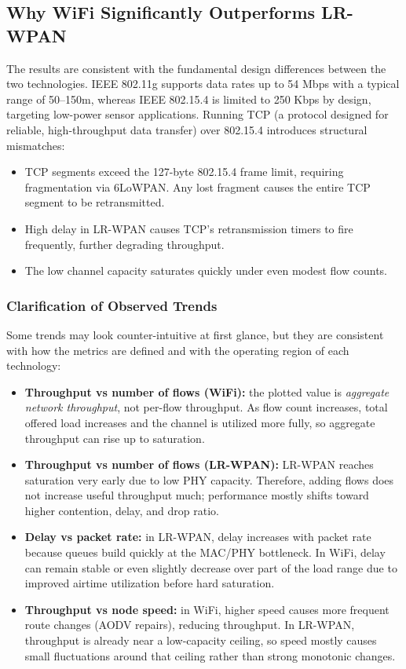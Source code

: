 \documentclass[12pt,a4paper]{article}
\begin{document}
\subsection{Why WiFi Significantly Outperforms LR-WPAN}

The results are consistent with the fundamental design differences between the two technologies. IEEE 802.11g supports data rates up to 54 Mbps with a typical range of 50--150m, whereas IEEE 802.15.4 is limited to 250 Kbps by design, targeting low-power sensor applications. Running TCP (a protocol designed for reliable, high-throughput data transfer) over 802.15.4 introduces structural mismatches:

\begin{itemize}
    \item TCP segments exceed the 127-byte 802.15.4 frame limit, requiring fragmentation via 6LoWPAN. Any lost fragment causes the entire TCP segment to be retransmitted.
    \item High delay in LR-WPAN causes TCP's retransmission timers to fire frequently, further degrading throughput.
    \item The low channel capacity saturates quickly under even modest flow counts.
\end{itemize}

\subsubsection{Clarification of Observed Trends}

Some trends may look counter-intuitive at first glance, but they are consistent with how the metrics are defined and with the operating region of each technology:

\begin{itemize}
    \item \textbf{Throughput vs number of flows (WiFi):} the plotted value is \emph{aggregate network throughput}, not per-flow throughput. As flow count increases, total offered load increases and the channel is utilized more fully, so aggregate throughput can rise up to saturation.
    \item \textbf{Throughput vs number of flows (LR-WPAN):} LR-WPAN reaches saturation very early due to low PHY capacity. Therefore, adding flows does not increase useful throughput much; performance mostly shifts toward higher contention, delay, and drop ratio.
    \item \textbf{Delay vs packet rate:} in LR-WPAN, delay increases with packet rate because queues build quickly at the MAC/PHY bottleneck. In WiFi, delay can remain stable or even slightly decrease over part of the load range due to improved airtime utilization before hard saturation.
    \item \textbf{Throughput vs node speed:} in WiFi, higher speed causes more frequent route changes (AODV repairs), reducing throughput. In LR-WPAN, throughput is already near a low-capacity ceiling, so speed mostly causes small fluctuations around that ceiling rather than strong monotonic changes.
\end{itemize}
\end{document}
